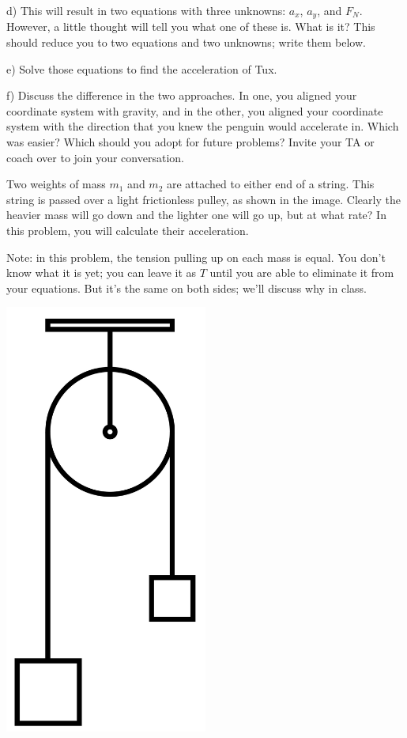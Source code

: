 \documentclass[12pt]{article}
\begin{document}
\vspace{3in}
\newpage

d) This will result in two equations with three unknowns: $a_x$, $a_y$, and $F_N$. However, a little thought will
tell you what one of these is. What is it? This should reduce you to two equations and two unknowns; write them below.

\vspace{2in}

e) Solve those equations to find the acceleration of Tux.

\vspace{2in}

f) Discuss the difference in the two approaches. In one, you aligned your coordinate system with gravity, and in the other, you aligned your coordinate system with the direction that you knew the penguin would accelerate in. Which was easier? Which 
should you adopt for future problems? Invite your TA or coach over to join your conversation.

\newpage
\begin{minipage}{0.7\textwidth}
Two weights of mass $m_1$ and $m_2$ are attached to either end of a string. This string is passed over a light frictionless pulley, as shown in the image.
Clearly the heavier mass will go down and the lighter one will go up, but at what rate? In this problem, you will calculate their acceleration.

Note: in this problem, the tension pulling up on each mass is equal. You don't know what it is yet; you can leave it as $T$ until you are able to eliminate it from your equations. But it's the same on both sides; we'll discuss why in class. 
\end{minipage} \hfill
\begin{minipage}{0.3\textwidth}
\begin{center}\includegraphics[width=0.5\textwidth]{atwood.png}
\end{center}
\end{minipage} \hfill
\end{document}
